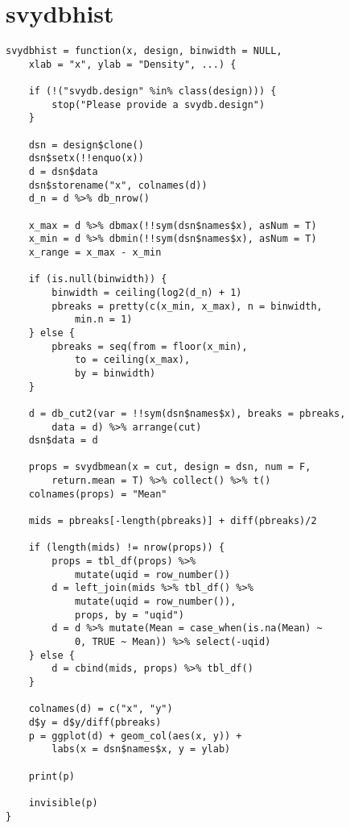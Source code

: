 \section{svydbhist}

\begin{lstlisting}
svydbhist = function(x, design, binwidth = NULL, 
    xlab = "x", ylab = "Density", ...) {
    
    if (!("svydb.design" %in% class(design))) {
        stop("Please provide a svydb.design")
    }
    
    dsn = design$clone()
    dsn$setx(!!enquo(x))
    d = dsn$data
    dsn$storename("x", colnames(d))
    d_n = d %>% db_nrow()
    
    x_max = d %>% dbmax(!!sym(dsn$names$x), asNum = T)
    x_min = d %>% dbmin(!!sym(dsn$names$x), asNum = T)
    x_range = x_max - x_min
    
    if (is.null(binwidth)) {
        binwidth = ceiling(log2(d_n) + 1)
        pbreaks = pretty(c(x_min, x_max), n = binwidth, 
            min.n = 1)
    } else {
        pbreaks = seq(from = floor(x_min), 
            to = ceiling(x_max),
            by = binwidth)
    }
    
    d = db_cut2(var = !!sym(dsn$names$x), breaks = pbreaks, 
        data = d) %>% arrange(cut)
    dsn$data = d
    
    props = svydbmean(x = cut, design = dsn, num = F, 
        return.mean = T) %>% collect() %>% t()
    colnames(props) = "Mean"
    
    mids = pbreaks[-length(pbreaks)] + diff(pbreaks)/2
    
    if (length(mids) != nrow(props)) {
        props = tbl_df(props) %>% 
            mutate(uqid = row_number())
        d = left_join(mids %>% tbl_df() %>% 
            mutate(uqid = row_number()), 
            props, by = "uqid")
        d = d %>% mutate(Mean = case_when(is.na(Mean) ~ 
            0, TRUE ~ Mean)) %>% select(-uqid)
    } else {
        d = cbind(mids, props) %>% tbl_df()
    }
    
    colnames(d) = c("x", "y")
    d$y = d$y/diff(pbreaks)
    p = ggplot(d) + geom_col(aes(x, y)) +
        labs(x = dsn$names$x, y = ylab)
    
    print(p)
    
    invisible(p)
}
\end{lstlisting}

